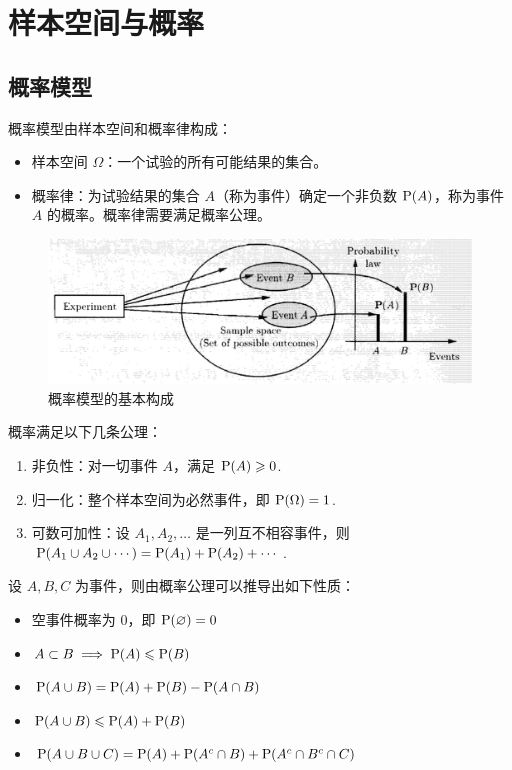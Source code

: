 \section{样本空间与概率}

\subsection{概率模型}

\begin{definition}[概率模型的基本构成]
概率模型由样本空间和概率律构成：
\begin{itemize}
    \item 样本空间 $\Omega$：一个试验的所有可能结果的集合。
    \item 概率律：为试验结果的集合 $A$（称为事件）确定一个非负数 $\mathrm{P}(A)$，称为事件 $A$ 的概率。概率律需要满足概率公理。
\end{itemize}
\begin{figure}[H]
    \centering
    \includegraphics[width=0.8\linewidth]{figs/概率模型的基本构成.png}
    \caption{概率模型的基本构成}
    \label{fig:prob-model-components}
\end{figure}
\end{definition}

\begin{definition}[概率公理]
概率满足以下几条公理：
\begin{enumerate}
    \item 非负性：对一切事件 $A$，满足 $\mathrm{P}(A)\geqslant 0$.
    \item 归一化：整个样本空间为必然事件，即 $\mathrm{P}(\Omega)=1$.
    \item 可数可加性：设 $A_1,A_2,\ldots$ 是一列互不相容事件，则 $\mathrm{P}(A_1\cup A_2\cup\cdots)=\mathrm{P}(A_1)+\mathrm{P}(A_2)+\cdots$.
\end{enumerate}
\end{definition}

\begin{property}
设 $A,B,C$ 为事件，则由概率公理可以推导出如下性质：
\begin{itemize}
    \item 空事件概率为 0，即 $\mathrm{P}(\varnothing)=0$
    \item $A\subset B\implies \mathrm{P}(A)\leqslant \mathrm{P}(B)$
    \item $\mathrm{P}(A\cup B)=\mathrm{P}(A)+\mathrm{P}(B)-\mathrm{P}(A\cap B)$
    \item $\mathrm{P}(A\cup B)\leqslant \mathrm{P}(A)+\mathrm{P}(B)$
    \item $\mathrm{P}(A\cup B\cup C)=\mathrm{P}(A)+\mathrm{P}(A^c\cap B)+\mathrm{P}(A^c\cap B^c\cap C)$
\end{itemize}
\end{property}


